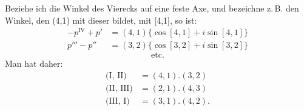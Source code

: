 Beziehe ich die Winkel des Vierecks auf eine feste Axe, und bezeichne z.\,B. den Winkel, den (4,1)
mit dieser bildet, mit [4,1], so ist:
\[
\begin{array}{rl}
-p^{\mathrm{IV}} + p' & = (4,1)\{\cos[4,1] + i\sin[4,1]\} \\
p''' - p'' & = (3,2)\{\cos[3,2] + i\sin[3,2]\}
\end{array}
\]
\[
\text{etc.}
\]
Man hat daher:
\[
\begin{array}{rl}
\text{(I, II)} & = (4,1) . (3,2) \\
\text{(II, III)} & = (2,1) . (4,3) \\
\text{(III, I)} & = (3,1) . (4,2).
\end{array}
\]
